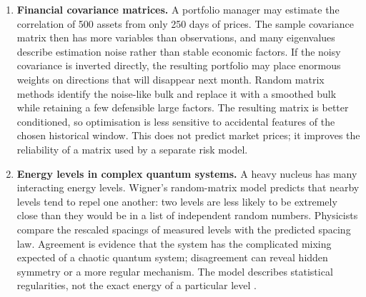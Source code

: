 \begin{enumerate}[leftmargin=*,itemsep=0.7em]
\item \textbf{Financial covariance matrices.}  A portfolio manager may estimate
the correlation of 500 assets from only 250 days of prices.  The sample
covariance matrix then has more variables than observations, and many
eigenvalues describe estimation noise rather than stable economic factors.
If the noisy covariance is inverted directly, the resulting portfolio may
place enormous weights on directions that will disappear next month.
Random matrix methods identify the noise-like bulk and replace it with a
smoothed bulk while retaining a few defensible large factors.  The resulting
matrix is better conditioned, so optimisation is less sensitive to
accidental features of the chosen historical window.  This does not predict
market prices; it improves the reliability of a matrix used by a separate
risk model.

\item \textbf{Energy levels in complex quantum systems.}  A heavy nucleus has many
interacting energy levels.  Wigner's random-matrix model predicts that nearby
levels tend to repel one another: two levels are less likely to be extremely
close than they would be in a list of independent random numbers.  Physicists
compare the rescaled spacings of measured levels with the predicted spacing
law.  Agreement is evidence that the system has the complicated mixing
expected of a chaotic quantum system; disagreement can reveal hidden
symmetry or a more regular mechanism.  The model describes statistical
regularities, not the exact energy of a particular level \cite{random_matrix_theory_ref1}.
\end{enumerate}


